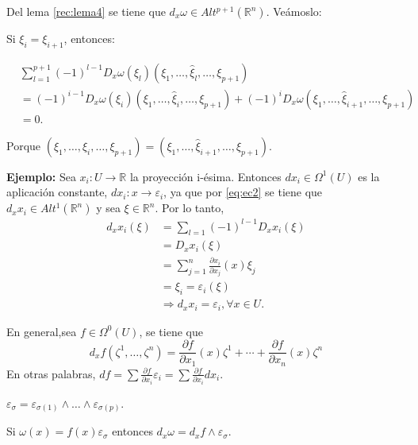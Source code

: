 Del lema \ref{rec:lema4} se tiene que $d_x\omega\in Alt^{p+1}(\mathbb{R}^n)$. Veámoslo:

Si $\xi_i=\xi_{i+1}$, entonces:

\begin{equation}
  \begin{split}
    &\sum_{l=1}^{p+1}(-1)^{l-1}D_x\omega(\xi_l)(\xi_1,\dots,\hat{\xi}_l,\dots,\xi_{p+1}) \\
    &=(-1)^{i-1}D_x\omega(\xi_i)(\xi_1,\dots,\hat{\xi}_i,\dots,\xi_{p+1})+(-1)^iD_x\omega(\xi_1,\dots,\hat{\xi}_{i+1},\dots,\xi_{p+1}) \\
    &=0. 
  \end{split}
\end{equation}

Porque $(\xi_1,\dots,\hat{\xi}_i,\dots,\xi_{p+1})=(\xi_1,\dots,\hat{\xi}_{i+1},\dots,\xi_{p+1}).$

\vspace{3mm}

\textbf{Ejemplo:} Sea $x_i:U\rightarrow \mathbb{R}$ la proyección i-ésima. Entonces $dx_i\in \Omega^1(U)$ es la aplicación constante,  $dx_i:x\rightarrow \varepsilon_i$, ya que por \ref{eq:ec2} se tiene que $d_xx_i\in Alt^1(\mathbb{R}^n)$ y sea $\xi\in \mathbb{R}^n$. Por lo tanto,
\begin{equation}
  \begin{split}
    d_xx_i(\xi)&=\sum_{l=1}(-1)^{l-1}D_xx_i(\xi)\\
    &= D_xx_i(\xi) \\
    &= \sum_{j=1}^n\frac{\partial x_i}{\partial x_j}(x)\xi_j \\
    &= \xi_i = \varepsilon_i(\xi) \\
    &\Rightarrow d_xx_i=\varepsilon_i,\forall x \in U.
  \end{split}
\end{equation}

En general,sea $f\in \Omega^0(U)$, se tiene que 
$$d_xf(\zeta^1,\dots,\zeta^n)=\frac{\partial f}{\partial x_1}(x)\zeta^1+\cdots + \frac{\partial f}{\partial x_n}(x)\zeta^n$$
En otras palabras, $df=\sum \frac{\partial f}{\partial x_i}\varepsilon_i=\sum \frac{\partial f}{\partial x_i}dx_i$. 

\begin{nota}
$\varepsilon_\sigma=\varepsilon_{\sigma(1)}\wedge \dots \wedge \varepsilon_{\sigma(p)}$.
\end{nota}

\newpage
\begin{Lem}
Si $\omega(x)=f(x)\varepsilon_\sigma$ entonces $d_x\omega=d_xf\wedge \varepsilon_\sigma$.
\end{Lem}

